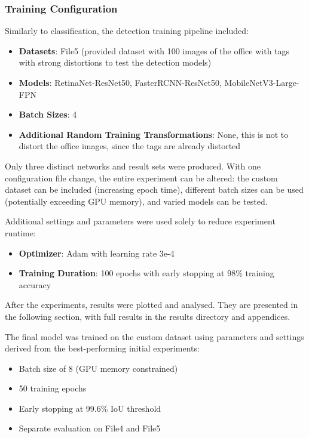 \documentclass[conference]{IEEEtran}
\begin{document}
\subsubsection{Training Configuration}

Similarly to classification, the detection training pipeline included:

\begin{itemize}
  \item \textbf{Datasets}: File5 (provided dataset with 100 images of the office with tags with strong distortions to test the detection models)
  \item \textbf{Models}: RetinaNet-ResNet50, FasterRCNN-ResNet50, MobileNetV3-Large-FPN
  \item \textbf{Batch Sizes}: 4
  \item \textbf{Additional Random Training Transformations}: None, this is not to distort the office images, since the tags are already distorted
\end{itemize}

Only three distinct networks and result sets were produced. With one configuration file change, the entire experiment can be altered:
the custom dataset can be included (increasing epoch time), different batch sizes can be used (potentially exceeding GPU memory), and
varied models can be tested.

Additional settings and parameters were used solely to reduce experiment runtime:

\begin{itemize}
    \item \textbf{Optimizer}: Adam with learning rate 3e-4
    \item \textbf{Training Duration}: 100 epochs with early stopping at 98\% training accuracy 
\end{itemize}

After the experiments, results were plotted and analysed. They are presented in the following section, with full results in the results
directory and appendices.

The final model was trained on the custom dataset using parameters and settings derived from the best-performing initial experiments:

\begin{itemize}
  \item Batch size of 8 (GPU memory constrained)
  \item 50 training epochs
  \item Early stopping at 99.6\% IoU threshold
  \item Separate evaluation on File4 and File5
\end{itemize}
\end{document}
